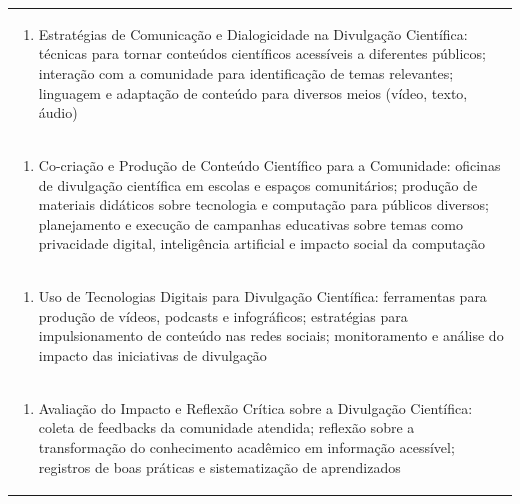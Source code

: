 \documentclass[11pt]{article}
\begin{document}
\begin{center}
\begin{longtable}{|p{4cm}|p{4cm}|p{4cm}|p{4cm}|}
\multicolumn{4}{|p{\dimexpr 16cm + 6\tabcolsep\relax}|}{\begin{enumerate}[start=2]\item Estratégias de Comunicação e Dialogicidade na Divulgação Científica: técnicas para tornar conteúdos científicos acessíveis a diferentes públicos; interação com a comunidade para identificação de temas relevantes; linguagem e adaptação de conteúdo para diversos meios (vídeo, texto, áudio)\end{enumerate}}\\
\multicolumn{4}{|p{\dimexpr 16cm + 6\tabcolsep\relax}|}{\begin{enumerate}[start=3]\item Co-criação e Produção de Conteúdo Científico para a Comunidade: oficinas de divulgação científica em escolas e espaços comunitários; produção de materiais didáticos sobre tecnologia e computação para públicos diversos; planejamento e execução de campanhas educativas sobre temas como privacidade digital, inteligência artificial e impacto social da computação\end{enumerate}}\\
\multicolumn{4}{|p{\dimexpr 16cm + 6\tabcolsep\relax}|}{\begin{enumerate}[start=4]\item Uso de Tecnologias Digitais para Divulgação Científica: ferramentas para produção de vídeos, podcasts e infográficos; estratégias para impulsionamento de conteúdo nas redes sociais; monitoramento e análise do impacto das iniciativas de divulgação\end{enumerate}}\\
\multicolumn{4}{|p{\dimexpr 16cm + 6\tabcolsep\relax}|}{\begin{enumerate}[start=5]\item Avaliação do Impacto e Reflexão Crítica sobre a Divulgação Científica: coleta de feedbacks da comunidade atendida; reflexão sobre a transformação do conhecimento acadêmico em informação acessível; registros de boas práticas e sistematização de aprendizados\end{enumerate}}\\

\end{longtable}
\end{center}
\end{document}
